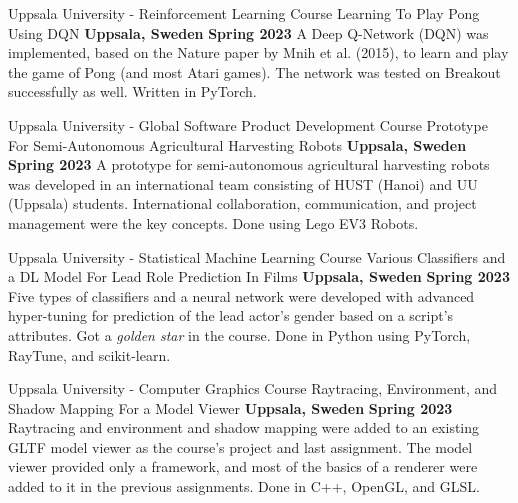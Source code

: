 

\begin{cventries}


       \cventry
        {Uppsala University - Reinforcement Learning Course} %
        {Learning To Play Pong Using DQN} %
        {\textbf{Uppsala, Sweden}} %
        {\textbf{Spring 2023}} %
        {
            A Deep Q-Network (DQN) was implemented, based on the Nature paper by Mnih et al. (2015), to learn and play the game of Pong (and most Atari games). The network was tested on Breakout successfully as well. Written in PyTorch.
        }
        
       \cventry
        {Uppsala University - Global Software Product Development Course} %
        {Prototype For Semi-Autonomous Agricultural Harvesting Robots} %
        {\textbf{Uppsala, Sweden}} %
        {\textbf{Spring 2023}} %
        {
            A prototype for semi-autonomous agricultural harvesting robots was developed in an international team consisting of HUST (Hanoi) and UU (Uppsala) students. International collaboration, communication, and project management were the key concepts. Done using Lego EV3 Robots.
        }

       \cventry
        {Uppsala University - Statistical Machine Learning Course} %
        {Various Classifiers and a DL Model For Lead Role Prediction In Films} %
        {\textbf{Uppsala, Sweden}} %
        {\textbf{Spring 2023}} %
        {
            Five types of classifiers and a neural network were developed with advanced hyper-tuning for prediction of the lead actor's gender based on a script's attributes. Got a \emph{golden star} in the course. Done in Python using PyTorch, RayTune, and scikit-learn.
        }

    \cventry
    {Uppsala University - Computer Graphics Course} %
    {Raytracing, Environment, and Shadow Mapping For a Model Viewer} %
    {\textbf{Uppsala, Sweden}} %
    {\textbf{Spring 2023}} %
    {
        Raytracing and environment and shadow mapping were added to an existing GLTF model viewer as the course's project and last assignment. The model viewer provided only a framework, and most of the basics of a renderer were added to it in the previous assignments. Done in C++, OpenGL, and GLSL. 
    }
  

\end{cventries}
